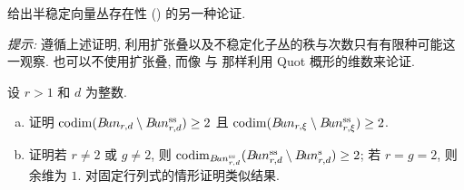 \begin{exercise}[简单]\label{src:9.2.17}
给出半稳定向量丛存在性 () 的另一种论证.

\textit{提示:} 遵循上述证明, 利用扩张叠以及不稳定化子丛的秩与次数只有有限种可能这一观察. 也可以不使用扩张叠, 而像 \cite[引理 4.3]{NR69} 与 \cite[\S8.6]{LP97} 那样利用 Quot 概形的维数来论证.
\end{exercise}
\begin{exercise}[简单]\label{src:9.2.18}
设 $r>1$ 和 $d$ 为整数.
\begin{enumerate}[(a)]
\item 证明 $\operatorname{codim}(B\!un_{r,d}\setminus B\!un_{r,d}^{\mathrm{ss}})\geq2$ 且 $\operatorname{codim}(B\!un_{r,\xi}\setminus B\!un_{r,\xi}^{\mathrm{ss}})\geq2$.
\item 证明若 $r\ne2$ 或 $g\ne2$, 则 $\operatorname{codim}_{B\!un_{r,d}^{\mathrm{ss}}}(B\!un_{r,d}^{\mathrm{ss}}\setminus B\!un_{r,d}^{\mathrm s})\geq2$; 若 $r=g=2$, 则余维为 $1$. 对固定行列式的情形证明类似结果.
\end{enumerate}
\end{exercise}

